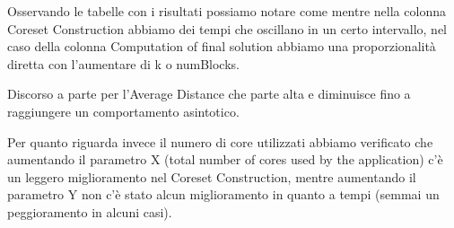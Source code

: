 \documentclass[10pt]{article}
\begin{document}
Osservando le tabelle con i risultati possiamo notare come mentre nella colonna Coreset Construction abbiamo dei tempi che oscillano in un certo intervallo, nel caso della colonna Computation of final solution abbiamo una proporzionalità diretta con l'aumentare di k o numBlocks.

Discorso a parte per l'Average Distance che parte alta e diminuisce fino a raggiungere un comportamento asintotico.

Per quanto riguarda invece il numero di core utilizzati abbiamo verificato che aumentando il parametro X (total number of cores used by the application) c'è un leggero miglioramento nel Coreset Construction, mentre aumentando il parametro Y non c'è stato alcun miglioramento in quanto a tempi (semmai un peggioramento in alcuni casi).






 
\end{document}
